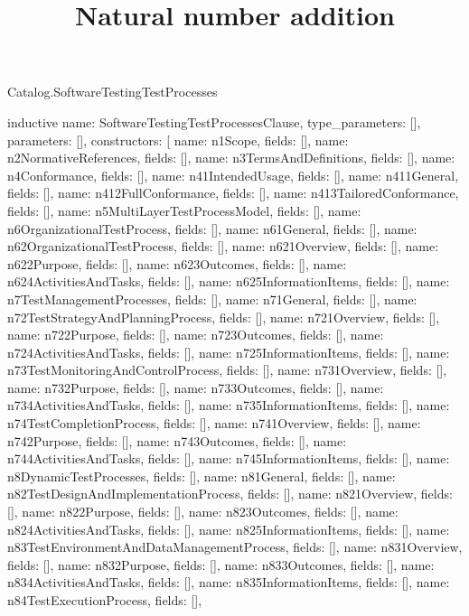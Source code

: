 \begin{lexlean}{Catalog.SoftwareTestingTestProcesses}
\title{Natural number addition}
\begin{semanticmodule}
inductive{
  name: SoftwareTestingTestProcessesClause,
  type_parameters: [],
  parameters: [],
  constructors: [
    {name: n1Scope, fields: []},
    {name: n2NormativeReferences, fields: []},
    {name: n3TermsAndDefinitions, fields: []},
    {name: n4Conformance, fields: []},
    {name: n41IntendedUsage, fields: []},
    {name: n411General, fields: []},
    {name: n412FullConformance, fields: []},
    {name: n413TailoredConformance, fields: []},
    {name: n5MultiLayerTestProcessModel, fields: []},
    {name: n6OrganizationalTestProcess, fields: []},
    {name: n61General, fields: []},
    {name: n62OrganizationalTestProcess, fields: []},
    {name: n621Overview, fields: []},
    {name: n622Purpose, fields: []},
    {name: n623Outcomes, fields: []},
    {name: n624ActivitiesAndTasks, fields: []},
    {name: n625InformationItems, fields: []},
    {name: n7TestManagementProcesses, fields: []},
    {name: n71General, fields: []},
    {name: n72TestStrategyAndPlanningProcess, fields: []},
    {name: n721Overview, fields: []},
    {name: n722Purpose, fields: []},
    {name: n723Outcomes, fields: []},
    {name: n724ActivitiesAndTasks, fields: []},
    {name: n725InformationItems, fields: []},
    {name: n73TestMonitoringAndControlProcess, fields: []},
    {name: n731Overview, fields: []},
    {name: n732Purpose, fields: []},
    {name: n733Outcomes, fields: []},
    {name: n734ActivitiesAndTasks, fields: []},
    {name: n735InformationItems, fields: []},
    {name: n74TestCompletionProcess, fields: []},
    {name: n741Overview, fields: []},
    {name: n742Purpose, fields: []},
    {name: n743Outcomes, fields: []},
    {name: n744ActivitiesAndTasks, fields: []},
    {name: n745InformationItems, fields: []},
    {name: n8DynamicTestProcesses, fields: []},
    {name: n81General, fields: []},
    {name: n82TestDesignAndImplementationProcess, fields: []},
    {name: n821Overview, fields: []},
    {name: n822Purpose, fields: []},
    {name: n823Outcomes, fields: []},
    {name: n824ActivitiesAndTasks, fields: []},
    {name: n825InformationItems, fields: []},
    {name: n83TestEnvironmentAndDataManagementProcess, fields: []},
    {name: n831Overview, fields: []},
    {name: n832Purpose, fields: []},
    {name: n833Outcomes, fields: []},
    {name: n834ActivitiesAndTasks, fields: []},
    {name: n835InformationItems, fields: []},
    {name: n84TestExecutionProcess, fields: []},
}
\end{semanticmodule}
\end{lexlean}
